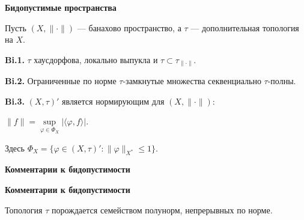 \documentclass[11pt]{article}
\let\ph\varphi
\begin{document}
\newpage

\begin{center}
{\color{notaeYELLOW}\bfseries\fontsize{44}{52}\selectfont Бидопустимые пространства}
\end{center}
\vspace*{\fill}
\begin{center}
\fontsize{36}{43}\selectfont
\parbox{\linewidth}{\centering\noindent Пусть $(X,\|\cdot\|)$ --- банахово пространство, а $\tau$ --- дополнительная топология на $X$.
\par}\vspace{0.4in}
\parbox{\linewidth}{\centering\noindent \textbf{Bi.1.} $\tau$ хаусдорфова, локально выпукла и $\tau\subset\tau_{\|\cdot\|}$.
\par}\vspace{0.4in}
\parbox{\linewidth}{\centering\noindent \textbf{Bi.2.} Ограниченные по норме $\tau$-замкнутые множества секвенциально $\tau$-полны.
\par}\vspace{0.4in}
\parbox{\linewidth}{\centering\noindent \textbf{Bi.3.} $(X,\tau)'$ является нормирующим для $(X,\|\cdot\|)$:
\par}\vspace{0.4in}
\parbox{\linewidth}{\centering\noindent $\|f\|=\sup\limits_{\ph\in\Phi_X}|\langle\ph,f\rangle|.$
\par}\vspace{0.4in}
\parbox{\linewidth}{\centering\noindent Здесь $\Phi_X=\{\ph\in(X,\tau)' : \|\ph\|_{X^*}\le 1\}$.
\par}\vspace{0.4in}
\end{center}
\vspace*{\fill}

\newpage

\begin{center}
{\color{notaeYELLOW}\bfseries\fontsize{44}{52}\selectfont Комментарии к бидопустимости}
\end{center}
\vspace*{\fill}
\begin{center}
\fontsize{36}{43}\selectfont
\end{center}
\vspace*{\fill}

\newpage

\begin{center}
{\color{notaeYELLOW}\bfseries\fontsize{44}{52}\selectfont Комментарии к бидопустимости}
\end{center}
\vspace*{\fill}
\begin{center}
\fontsize{36}{43}\selectfont
\parbox{\linewidth}{\centering\noindent Топология $\tau$ порождается семейством полунорм, непрерывных по норме.
\par}\vspace{0.4in}
\end{center}
\vspace*{\fill}
\end{document}
